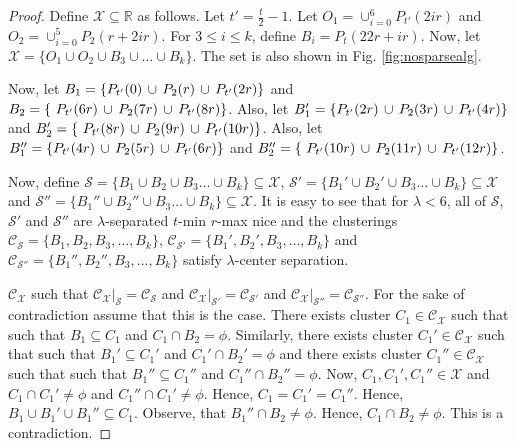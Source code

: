 \documentclass[anon,12pt]{colt2016} %
\newcommand{\mc}{\mathcal}
\begin{document}
\begin{proof}
Define $\mc X \subseteq \mathbb{R}$ as follows. Let $t' = \frac{t}{2}-1$. Let $O_1 = \cup_{i=0}^6 P_{t'}(2ir)$ and $O_2 = \cup_{i=0}^5 P_2(r+2ir)$. For $3\le i\le k$, define $B_i = P_t(22r+ir)$. Now, let $\mc X = \{O_1 \cup O_2 \cup B_3 \cup \ldots \cup B_k\}$. The set is also shown in Fig. \ref{fig:nosparsealg}.

Now, let $B_1 = \{P_{t'}(0) \thinspace\cup\thinspace  P_{2}(r) \thinspace\cup\thinspace P_{t'}(2r) \}$ and $B_2 = \{\ P_{t'}(6r) \thinspace\cup\thinspace P_{2}(7r)\thinspace\cup\thinspace P_{t'}(8r)\}$. Also, let $B_1' = \{P_{t'}(2r) \thinspace\cup\thinspace  P_{2}(3r) \thinspace\cup\thinspace P_{t'}(4r) \}$ and $B_2' = \{\ P_{t'}(8r) \thinspace\cup\thinspace P_{2}(9r)\thinspace\cup\thinspace P_{t'}(10r)\}$. Also, let $B_1'' = \{P_{t'}(4r) \thinspace\cup\thinspace  P_{2}(5r) \thinspace\cup\thinspace P_{t'}(6r) \}$ and $B_2'' = \{\ P_{t'}(10r) \thinspace\cup\thinspace P_{2}(11r)\thinspace\cup\thinspace P_{t'}(12r)\}$. 

Now, define $\mc S = \{B_1 \cup B_2 \cup B_3\ldots \cup B_k\} \subseteq \mc X$, $\mc S' = \{B_1' \cup B_2' \cup B_3\ldots \cup B_k\} \subseteq \mc X$ and $\mc S'' = \{B_1'' \cup B_2'' \cup B_3\ldots \cup B_k\} \subseteq \mc X$. It is easy to see that for $\lambda < 6$, all of $\mc S$, $\mc S'$ and $\mc S''$ are $\lambda$-separated $t$-min $r$-max nice and the clusterings $\mc C_{\mc S} = \{B_1, B_2, B_3, \ldots, B_k\}$, $\mc C_{\mc S'} = \{B_1', B_2', B_3, \ldots, B_k\}$ and $\mc C_{\mc S''} = \{B_1'', B_2'', B_3, \ldots, B_k\}$ satisfy $\lambda$-center separation.

$\mc C_{\mc X}$ such that $\mc C_{\mc X}|_{\mc S} = \mc C_{\mc S}$ and $\mc C_{\mc X}|_{\mc S'} = \mc C_{\mc S'}$ and $\mc C_{\mc X}|_{\mc S''} = \mc C_{\mc S''}$. For the sake of contradiction assume that this is the case. There exists cluster $C_1 \in \mc C_{\mc X}$ such that such that $B_1 \subseteq C_1$ and $C_1 \cap B_2 = \phi$. Similarly, there exists cluster $C_1' \in \mc C_{\mc X}$ such that such that $B_1' \subseteq C_1'$ and $C_1' \cap B_2' = \phi$ and there exists cluster $C_1'' \in \mc C_{\mc X}$ such that such that $B_1'' \subseteq C_1''$ and $C_1'' \cap B_2'' = \phi$. Now, $C_1, C_1', C_1'' \in \mc X$ and $C_1 \cap C_1' \neq \phi$ and $C_1'' \cap C_1' \neq \phi$. Hence, $C_1 = C_1' = C_1''$. Hence, $B_1 \cup B_1' \cup B_1'' \subseteq C_1$. Observe, that $B_1'' \cap B_2 \neq \phi$. Hence, $C_1\cap B_2 \neq \phi$. This is a contradiction.
\end{proof}
\end{document}
